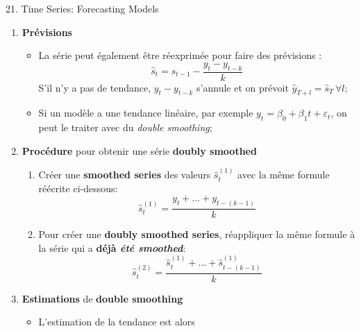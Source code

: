 \documentclass[12pt, titlepage, french]{report}
\begin{document}
\begin{CHPT_SUMM}[label = {timeseries21}]{21. Time Series: Forecasting Models}
\begin{enumerate}
\begin{itemize}
		\texttt{[image: src/smoothing-example.png]}
		\item	Un bon exemple de ceci en pratique est l'indice des prix à la consommation pour stabiliser les augmentations et mieux identifier les tendances;
		\item	La balance est donc de bien balancer le $k$ pour identifier les tendances sans faire de \textbf{oversmoothing} et être incapable d'identifier les vraies tendances;
		\end{itemize}
	\item[]	\textbf{Prévisions}
		\begin{itemize}
		\item	La série peut également être réexprimée pour faire des prévisions :
			\begin{equation*}
			\hat{s}_{t}	=	\hat{s}_{t - 1} - \frac{y_{t} - y_{t - k}}{k}
			\end{equation*}
			S'il n'y a pas de tendance, $y_{t} - y_{t - k}$ s'annule et on prévoit $\hat{y}_{T + l} = \hat{s}_{T} \, \forall l$;
		\item	Si un modèle a une tendance linéaire, par exemple $y_{t} = \beta_{0} + \beta_{1} t + \varepsilon_{t}$, on peut le traiter avec du \textit{double smoothing};
		\end{itemize}
	\item[]	\textbf{Procédure} pour obtenir une série \textbf{doubly smoothed}
		\begin{enumerate}
		\item	Créer une \textbf{smoothed series} des valeurs $\hat{s}_{t}^{(1)}$ avec la même formule réécrite ci-dessous:
			\begin{equation*}
			\hat{s}_{t}^{(1)}	
				=	\frac{y_{t} + \dots + y_{t - (k - 1)}}{k}
			\end{equation*}
		\item	Pour	 créer une \textbf{doubly smoothed series}, réappliquer la même formule à la série qui a \textbf{déjà \textit{été smoothed}}:
			\begin{equation*}
			\hat{s}_{t}^{(2)}	
				=	\frac{\hat{s}_{t}^{(1)} + \dots + \hat{s}_{t - (k - 1)}^{(1)}}{k}
			\end{equation*}
		\end{enumerate}
	\item[]	\textbf{Estimations} de \textbf{double smoothing}
		\begin{itemize}
		\item	L'estimation de la tendance est alors
			\begin{equation*}

\end{equation*}
\end{itemize}
\end{enumerate}
\end{CHPT_SUMM}
\end{document}
